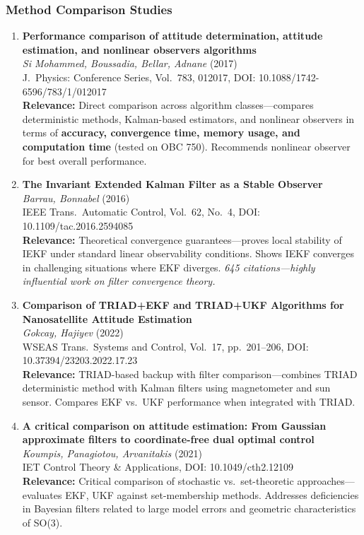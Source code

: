 \documentclass[11pt]{article}
\begin{document}
\subsubsection{Method Comparison Studies}

\begin{enumerate}[label=\textbf{\arabic*.},resume]
    \item \textbf{Performance comparison of attitude determination, attitude estimation, and nonlinear observers algorithms}\\
    \textit{Si Mohammed, Boussadia, Bellar, Adnane} (2017)\\
    J.\ Physics: Conference Series, Vol.\ 783, 012017, DOI: 10.1088/1742-6596/783/1/012017\\
    \textbf{Relevance:} Direct comparison across algorithm classes---compares deterministic methods, Kalman-based estimators, and nonlinear observers in terms of \textbf{accuracy, convergence time, memory usage, and computation time} (tested on OBC 750). Recommends nonlinear observer for best overall performance.

    \item \textbf{The Invariant Extended Kalman Filter as a Stable Observer}\\
    \textit{Barrau, Bonnabel} (2016)\\
    IEEE Trans.\ Automatic Control, Vol.\ 62, No.\ 4, DOI: 10.1109/tac.2016.2594085\\
    \textbf{Relevance:} Theoretical convergence guarantees---proves local stability of IEKF under standard linear observability conditions. Shows IEKF converges in challenging situations where EKF diverges. \textit{645 citations---highly influential work on filter convergence theory.}

    \item \textbf{Comparison of TRIAD+EKF and TRIAD+UKF Algorithms for Nanosatellite Attitude Estimation}\\
    \textit{Gokcay, Hajiyev} (2022)\\
    WSEAS Trans.\ Systems and Control, Vol.\ 17, pp.\ 201--206, DOI: 10.37394/23203.2022.17.23\\
    \textbf{Relevance:} TRIAD-based backup with filter comparison---combines TRIAD deterministic method with Kalman filters using magnetometer and sun sensor. Compares EKF vs.\ UKF performance when integrated with TRIAD.

    \item \textbf{A critical comparison on attitude estimation: From Gaussian approximate filters to coordinate-free dual optimal control}\\
    \textit{Koumpis, Panagiotou, Arvanitakis} (2021)\\
    IET Control Theory \& Applications, DOI: 10.1049/cth2.12109\\
    \textbf{Relevance:} Critical comparison of stochastic vs.\ set-theoretic approaches---evaluates EKF, UKF against set-membership methods. Addresses deficiencies in Bayesian filters related to large model errors and geometric characteristics of SO(3).
\end{enumerate}
\end{document}
